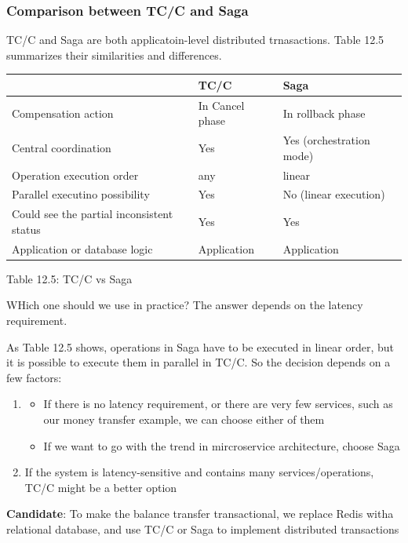 \documentclass{report}
\theoremstyle{definition}
\let\oldsubsubsection\subsubsection
\renewcommand{\subsubsection}{\oldsubsubsection*}
\begin{document}
\subsubsection{Comparison between TC/C and Saga}

TC/C and Saga are both applicatoin-level distributed trnasactions. Table 12.5 summarizes their similarities and differences.

\begin{tabular}{|p{4cm}|p{4cm}|p{4cm}|}
\hline
 & TC/C & Saga \\
\hline
Compensation action & In Cancel phase & In rollback phase \\
\hline
Central coordination & Yes & Yes (orchestration mode) \\
\hline
Operation execution order & any & linear \\
\hline
Parallel executino possibility & Yes & No (linear execution) \\
\hline
Could see the partial inconsistent status & Yes & Yes \\
\hline
Application or database logic & Application & Application \\
\hline
\end{tabular}

Table 12.5: TC/C vs Saga

WHich one should we use in practice? The answer depends on the latency requirement.

As Table 12.5 shows, operations in Saga have to be executed in linear order, but it is possible to execute them in parallel in TC/C. So the decision depends on a few factors:

\begin{enumerate}
\item

\begin{itemize}
\item
If there is no latency requirement, or there are very few services, such as our money transfer example, we can choose either of them
\item
If we want to go with the trend in mircroservice architecture, choose Saga
\end{itemize}
\item
If the system is latency-sensitive and contains many services/operations, TC/C might be a better option
\end{enumerate}

\textbf{Candidate}: To make the balance transfer transactional, we replace Redis witha relational database, and use TC/C or Saga to implement distributed transactions
\end{document}
